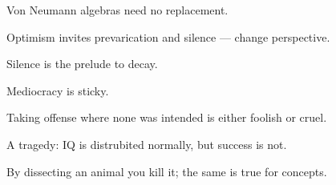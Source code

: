 \documentclass[a]{subfiles}
\begin{document}
\begin{parsec}%
Von Neumann algebras
need no replacement.
\end{parsec}
\begin{parsec}%
Optimism
invites prevarication and silence
--- change perspective.
\end{parsec}
\begin{parsec}%
Silence is the prelude to decay.
\end{parsec}
\begin{parsec}%
Mediocracy is sticky.
\end{parsec}
\begin{parsec}%
Taking offense where none was intended
is either foolish or cruel.
\end{parsec}
\begin{parsec}%
A tragedy:
IQ is distrubited normally,
but success is not.
\end{parsec}
\begin{parsec}%
By dissecting an animal you kill it;
the same is true for concepts.
\end{parsec}
\end{document}
